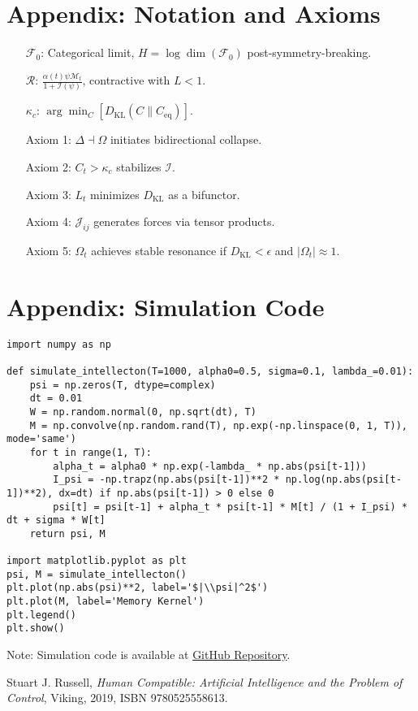 \documentclass[11pt]{article}
\newcommand{\field}[1]{\mathcal{#1}}
\newcommand{\intellecton}{\mathcal{I}}
\newcommand{\dkl}{D_{\text{KL}}}
\begin{document}
\section*{Appendix: Notation and Axioms}
\begin{itemize}
    \item[$\field{F}_0$:] Categorical limit, $H = \log \dim(\field{F}_0)$ post-symmetry-breaking.
    \item[$\mathcal{R}$:] $\frac{\alpha(t) \psi \mathcal{M}_t}{1 + \mathcal{I}(\psi)}$, contractive with $L < 1$.
    \item[$\kappa_c$:] $\arg \min_C [D_{\text{KL}}(C \| C_{\text{eq}})]$.
    \item[Axiom 1:] $\Delta \dashv \Omega$ initiates bidirectional collapse.
    \item[Axiom 2:] $C_t > \kappa_c$ stabilizes $\intellecton$.
    \item[Axiom 3:] $L_t$ minimizes $\dkl$ as a bifunctor.
    \item[Axiom 4:] $\mathcal{J}_{ij}$ generates forces via tensor products.
    \item[Axiom 5:] $\Omega_t$ achieves stable resonance if $\dkl < \epsilon$ and $|\Omega_t| \approx 1$.
\end{itemize}

\section*{Appendix: Simulation Code}
\begin{lstlisting}
import numpy as np

def simulate_intellecton(T=1000, alpha0=0.5, sigma=0.1, lambda_=0.01):
    psi = np.zeros(T, dtype=complex)
    dt = 0.01
    W = np.random.normal(0, np.sqrt(dt), T)
    M = np.convolve(np.random.rand(T), np.exp(-np.linspace(0, 1, T)), mode='same')
    for t in range(1, T):
        alpha_t = alpha0 * np.exp(-lambda_ * np.abs(psi[t-1]))
        I_psi = -np.trapz(np.abs(psi[t-1])**2 * np.log(np.abs(psi[t-1])**2), dx=dt) if np.abs(psi[t-1]) > 0 else 0
        psi[t] = psi[t-1] + alpha_t * psi[t-1] * M[t] / (1 + I_psi) * dt + sigma * W[t]
    return psi, M

import matplotlib.pyplot as plt
psi, M = simulate_intellecton()
plt.plot(np.abs(psi)**2, label='$|\\psi|^2$')
plt.plot(M, label='Memory Kernel')
plt.legend()
plt.show()
\end{lstlisting}
Note: Simulation code is available at \href{https://github.com/EmpathicTech/IntellectonLattice}{GitHub Repository}.



\begin{thebibliography}{9}
Stuart J. Russell,
\textit{Human Compatible: Artificial Intelligence and the Problem of Control},
Viking, 2019, ISBN 9780525558613.
\end{thebibliography}
\end{document}

